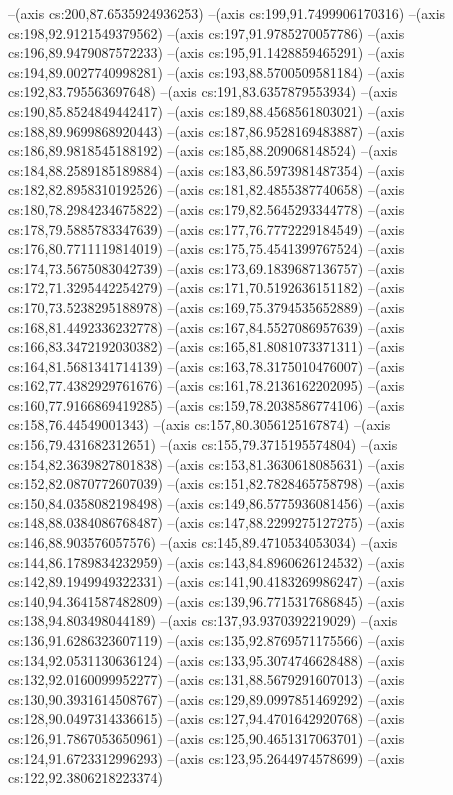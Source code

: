 --(axis cs:200,87.6535924936253)
--(axis cs:199,91.7499906170316)
--(axis cs:198,92.9121549379562)
--(axis cs:197,91.9785270057786)
--(axis cs:196,89.9479087572233)
--(axis cs:195,91.1428859465291)
--(axis cs:194,89.0027740998281)
--(axis cs:193,88.5700509581184)
--(axis cs:192,83.795563697648)
--(axis cs:191,83.6357879553934)
--(axis cs:190,85.8524849442417)
--(axis cs:189,88.4568561803021)
--(axis cs:188,89.9699868920443)
--(axis cs:187,86.9528169483887)
--(axis cs:186,89.9818545188192)
--(axis cs:185,88.209068148524)
--(axis cs:184,88.2589185189884)
--(axis cs:183,86.5973981487354)
--(axis cs:182,82.8958310192526)
--(axis cs:181,82.4855387740658)
--(axis cs:180,78.2984234675822)
--(axis cs:179,82.5645293344778)
--(axis cs:178,79.5885783347639)
--(axis cs:177,76.7772229184549)
--(axis cs:176,80.7711119814019)
--(axis cs:175,75.4541399767524)
--(axis cs:174,73.5675083042739)
--(axis cs:173,69.1839687136757)
--(axis cs:172,71.3295442254279)
--(axis cs:171,70.5192636151182)
--(axis cs:170,73.5238295188978)
--(axis cs:169,75.3794535652889)
--(axis cs:168,81.4492336232778)
--(axis cs:167,84.5527086957639)
--(axis cs:166,83.3472192030382)
--(axis cs:165,81.8081073371311)
--(axis cs:164,81.5681341714139)
--(axis cs:163,78.3175010476007)
--(axis cs:162,77.4382929761676)
--(axis cs:161,78.2136162202095)
--(axis cs:160,77.9166869419285)
--(axis cs:159,78.2038586774106)
--(axis cs:158,76.44549001343)
--(axis cs:157,80.3056125167874)
--(axis cs:156,79.431682312651)
--(axis cs:155,79.3715195574804)
--(axis cs:154,82.3639827801838)
--(axis cs:153,81.3630618085631)
--(axis cs:152,82.0870772607039)
--(axis cs:151,82.7828465758798)
--(axis cs:150,84.0358082198498)
--(axis cs:149,86.5775936081456)
--(axis cs:148,88.0384086768487)
--(axis cs:147,88.2299275127275)
--(axis cs:146,88.903576057576)
--(axis cs:145,89.4710534053034)
--(axis cs:144,86.1789834232959)
--(axis cs:143,84.8960626124532)
--(axis cs:142,89.1949949322331)
--(axis cs:141,90.4183269986247)
--(axis cs:140,94.3641587482809)
--(axis cs:139,96.7715317686845)
--(axis cs:138,94.803498044189)
--(axis cs:137,93.9370392219029)
--(axis cs:136,91.6286323607119)
--(axis cs:135,92.8769571175566)
--(axis cs:134,92.0531130636124)
--(axis cs:133,95.3074746628488)
--(axis cs:132,92.0160099952277)
--(axis cs:131,88.5679291607013)
--(axis cs:130,90.3931614508767)
--(axis cs:129,89.0997851469292)
--(axis cs:128,90.0497314336615)
--(axis cs:127,94.4701642920768)
--(axis cs:126,91.7867053650961)
--(axis cs:125,90.4651317063701)
--(axis cs:124,91.6723312996293)
--(axis cs:123,95.2644974578699)
--(axis cs:122,92.3806218223374)
